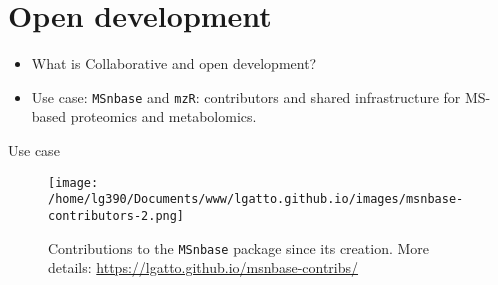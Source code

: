 \section{Open development}


\begin{frame}{}
 
  \begin{itemize}
  \item What is Collaborative and open development?
  \item Use case: \texttt{MSnbase} and \texttt{mzR}: contributors and
    shared infrastructure for MS-based proteomics and metabolomics.
  \end{itemize}
  
\end{frame}


\begin{frame}{Use case}

  \begin{figure}[h]
    \centering
    \texttt{[image: /home/lg390/Documents/www/lgatto.github.io/images/msnbase-contributors-2.png]}
    \caption{Contributions to the \texttt{MSnbase} package since its
      creation. More details:
      \url{https://lgatto.github.io/msnbase-contribs/}}
    \label{fig:msnbase}
  \end{figure}
  
  
  
\end{frame}